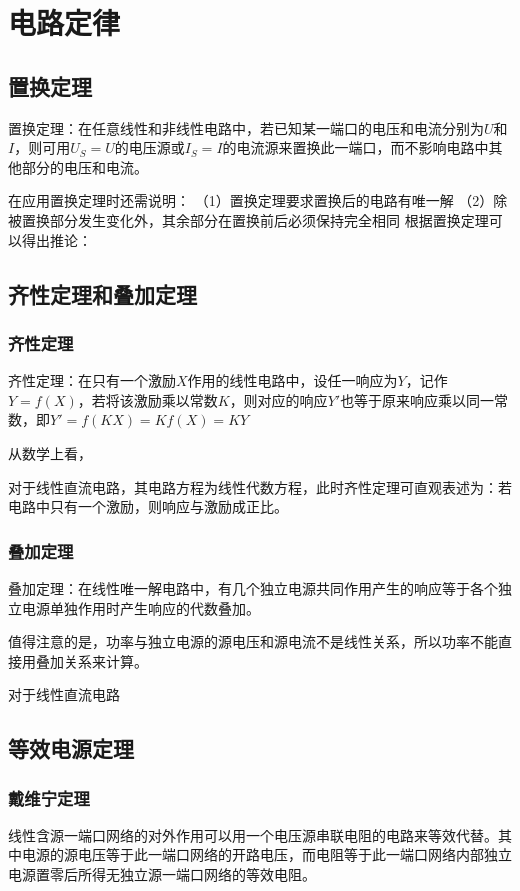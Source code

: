 \chapter{电路定律}

\section{置换定理}
置换定理：在任意线性和非线性电路中，若已知某一端口的电压和电流分别为$U$和$I$，则可用$U_S=U$的电压源或$I_S=I$的电流源来置换此一端口，而不影响电路中其他部分的电压和电流。

在应用置换定理时还需说明：
（1）置换定理要求置换后的电路有唯一解
（2）除被置换部分发生变化外，其余部分在置换前后必须保持完全相同
根据置换定理可以得出推论：

\section{齐性定理和叠加定理}
\subsection{齐性定理}
齐性定理：在只有一个激励$X$作用的线性电路中，设任一响应为$Y$，记作$Y=f(X)$，若将该激励乘以常数$K$，则对应的响应$Y'$也等于原来响应乘以同一常数，即$Y'=f(KX)=Kf(X)=KY$

从数学上看，

对于线性直流电路，其电路方程为线性代数方程，此时齐性定理可直观表述为：若电路中只有一个激励，则响应与激励成正比。

\subsection{叠加定理}
叠加定理：在线性唯一解电路中，有几个独立电源共同作用产生的响应等于各个独立电源单独作用时产生响应的代数叠加。

值得注意的是，功率与独立电源的源电压和源电流不是线性关系，所以功率不能直接用叠加关系来计算。

对于线性直流电路

\section{等效电源定理}
\subsection{戴维宁定理}
线性含源一端口网络的对外作用可以用一个电压源串联电阻的电路来等效代替。其中电源的源电压等于此一端口网络的开路电压，而电阻等于此一端口网络内部独立电源置零后所得无独立源一端口网络的等效电阻。

